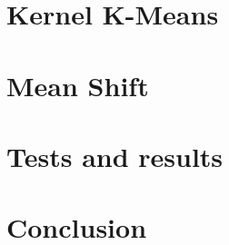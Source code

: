\documentclass{rapport_log}
\begin{document}
	\chapter{Kernel K-Means}
		
	\chapter{Mean Shift}
		
	\chapter{Tests and results}
        
	\chapter*{Conclusion}
		
%		
\end{document}
